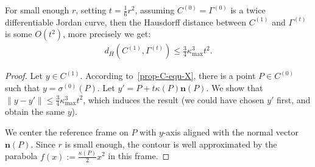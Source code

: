 \documentclass[review]{siamart220329}
\begin{document}
\begin{proposition}\label{prop:bcf-close-to-csf}
  For small enough $r$, setting $t = \frac{1}{6}r^2$, assuming $C^{(0)}=\Gamma^{(0)}$ is a twice differentiable Jordan curve, then the Hausdorff distance between
  $C^{(1)}$ and $\Gamma^{(t)}$ is some $O(t^2)$, more precisely we get:
  \begin{align*}
    d_H( C^{(1)}, \Gamma^{(t)} ) \le \frac{3}{4} \kappa_{\max}^3 t^2.
  \end{align*}
\end{proposition}
\begin{proof}
  Let $y \in C^{(1)}$. According to~\cref{prop-C-equ-X},
  there is a point $P \in C^{(0)}$ such that
  $y=\sigma^{(0)}(P)$. Let $y'=P+t\kappa(P)\mathbf{n}(P)$. We
  show that $\| y-y' \| \le \frac{3}{4} \kappa_{\max}^3 t^2$,
  which induces the result (we could have chosen $y'$ first, and
  obtain the same $y$).

  We center the reference frame on $P$ with $y$-axis aligned with the
  normal vector $\mathbf{n}(P)$.  Since $r$ is small enough, the
  contour is well approximated by the parabola $f(x) :=
  \frac{\kappa(P)}{2}x^2$ in this frame.


\end{proof}
\end{document}
